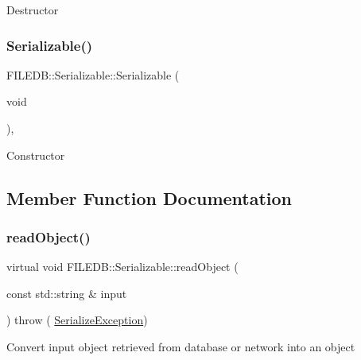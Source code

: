 Destructor \mbox{\label{classFILEDB_1_1Serializable_a09ab427f4720be7429003f4c78adda16}} 
\subsubsection{\texorpdfstring{Serializable()}{Serializable()}\hspace{0.1cm}{\footnotesize\ttfamily [2/2]}}
{\footnotesize\ttfamily F\+I\+L\+E\+D\+B\+::\+Serializable\+::\+Serializable (\begin{DoxyParamCaption}\item[{void}]{ }\end{DoxyParamCaption})\hspace{0.3cm}{\ttfamily [inline]}, {\ttfamily [protected]}}

Constructor 

\subsection{Member Function Documentation}
\mbox{\label{classFILEDB_1_1Serializable_a21a5831fa4f65790490a8a5eba9fcab2}} 
\subsubsection{\texorpdfstring{readObject()}{readObject()}\hspace{0.1cm}{\footnotesize\ttfamily [1/2]}}
{\footnotesize\ttfamily virtual void F\+I\+L\+E\+D\+B\+::\+Serializable\+::read\+Object (\begin{DoxyParamCaption}\item[{const std\+::string \&}]{input }\end{DoxyParamCaption}) throw ( \mbox{\hyperlink{classFILEDB_1_1SerializeException}{Serialize\+Exception}}) \hspace{0.3cm}{\ttfamily [pure virtual]}}

Convert input object retrieved from database or network into an object 

